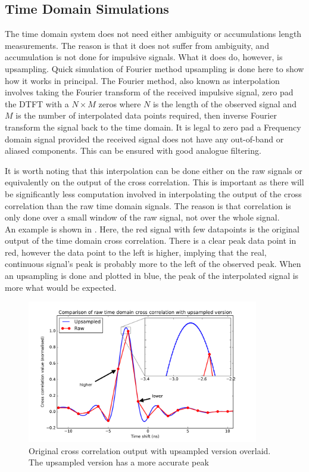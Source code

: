 \subsection{Time Domain Simulations}
The time domain system does not need either ambiguity or accumulations length measurements. The reason is that it does not suffer from ambiguity, and accumulation is not done for impulsive signals. What it does do, however, is upsampling. Quick simulation of Fourier method upsampling is done here to show how it works in principal. The Fourier method, also known as interpolation involves taking the Fourier transform of the received impulsive signal, zero pad the DTFT with a \(N \times M\) zeros where \(N\) is the length of the observed signal and \(M\) is the number of interpolated data points required, then inverse Fourier transform the signal back to the time domain. It is legal to zero pad a Frequency domain signal provided the received signal does not have any out-of-band or aliased components. This can be ensured with good analogue filtering.

It is worth noting that this interpolation can be done either on the raw signals or equivalently on the output of the cross correlation. This is important as there will be significantly less computation involved in interpolating the output of the cross correlation than the raw time domain signals. The reason is that correlation is only done over a small window of the raw signal, not over the whole signal.\\

An example is shown in . Here, the red signal with few datapoints is the original output of the time domain cross correlation. There is a clear peak data point in red, however the data point to the left is higher, implying that the real, continuous signal's peak is probably more to the left of the observed peak. When an upsampling is done and plotted in blue, the peak of the interpolated signal is more what would be expected.

\begin{figure}
  \centering
  \includegraphics[width=0.9\textwidth]{time-domain-cross-raw-vs-upped}
  \caption{Original cross correlation output with upsampled version overlaid. The upsampled version has a more accurate peak}
  \label{fig:system-design-raw-vs-upsampled-timedomain}
\end{figure}

